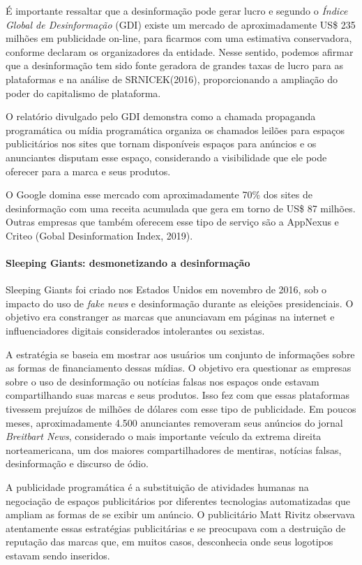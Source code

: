 É importante ressaltar que a desinformação pode gerar lucro e segundo o
\emph{Índice Global de Desinformação} (GDI) existe um mercado de
aproximadamente US\$ 235 milhões em publicidade on-line, para ficarmos
com uma estimativa conservadora, conforme declaram os organizadores da
entidade. Nesse sentido, podemos afirmar que a desinformação tem sido
fonte geradora de grandes taxas de lucro para as plataformas e na
análise de SRNICEK(2016), proporcionando a ampliação do poder do
capitalismo de plataforma.

O relatório divulgado pelo GDI demonstra como a chamada propaganda
programática ou mídia programática organiza os chamados leilões para
espaços publicitários nos sites que tornam disponíveis espaços para
anúncios e os anunciantes disputam esse espaço, considerando a
visibilidade que ele pode oferecer para a marca e seus produtos.

O Google domina esse mercado com aproximadamente 70\% dos sites de
desinformação com uma receita acumulada que gera em torno de US\$ 87
milhões. Outras empresas que também oferecem esse tipo de serviço são a
AppNexus e Criteo (Gobal Desinformation Index, 2019).

\paragraph{Sleeping Giants: desmonetizando a desinformação}

Sleeping Giants foi criado nos Estados Unidos em novembro de 2016, sob o
impacto do uso de \emph{fake news} e desinformação durante as eleições
presidenciais. O objetivo era constranger as marcas que anunciavam em
páginas na internet e influenciadores digitais considerados intolerantes
ou sexistas.

A estratégia se baseia em mostrar aos usuários um conjunto de
informações sobre as formas de financiamento dessas mídias. O objetivo
era questionar as empresas sobre o uso de desinformação ou notícias
falsas nos espaços onde estavam compartilhando suas marcas e seus
produtos. Isso fez com que essas plataformas tivessem prejuízos de
milhões de dólares com esse tipo de publicidade. Em poucos meses,
aproximadamente 4.500 anunciantes removeram seus anúncios do jornal
\emph{Breitbart News}, considerado o mais importante veículo da extrema
direita norteamericana, um dos maiores compartilhadores de mentiras,
notícias falsas, desinformação e discurso de ódio.

A publicidade programática é a substituição de atividades humanas na
negociação de espaços publicitários por diferentes tecnologias
automatizadas que ampliam as formas de se exibir um anúncio. O
publicitário Matt Rivitz observava atentamente essas estratégias
publicitárias e se preocupava com a destruição de reputação das marcas
que, em muitos casos, desconhecia onde seus logotipos estavam sendo
inseridos.

